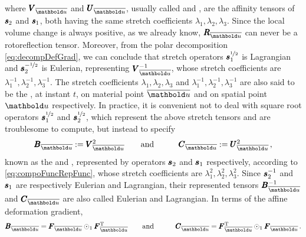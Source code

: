 where $\tnr{V}_{\overline{\vto{u}}}$ and $\tnr{U}_{\overline{\vto{u}}}$, usually called  and , are the affinity tensors of $\pmb{\mathit{s}}_2$ and $\pmb{\mathit{s}}_1$, both having the same stretch coefficients $\lambda_1,\lambda_2,\lambda_3$. Since the local volume change is always positive, as we already know, $\tnr{R}_{\overline{\vto{u}}}$ can never be a rotoreflection tensor. Moreover, from the polar decomposition \eqref{eq:decompDefGrad}, we can conclude that stretch operators $\pmb{s}_1^{\nicefrac{1}{2}}$ is Lagrangian and $\pmb{s}_2^{-\nicefrac{1}{2}}$ is Eulerian, representing $\tnr{V}_{\overline{\vto{u}}}^{-1}$, whose stretch coefficients are $\lambda_1^{-1},\lambda_2^{-1},\lambda_3^{-1}$. The stretch coefficients $\lambda_1,\lambda_2,\lambda_3$ and $\lambda_1^{-1},\lambda_2^{-1},\lambda_3^{-1}$ are also said to be the , at instant $t$, on material point $\overline{\vto{u}}$ and on spatial point $\vto{u}$ respectively. In practice, it is convenient not to deal with square root operators $\pmb{s}_1^{\nicefrac{1}{2}}$ and $\pmb{s}_2^{\nicefrac{1}{2}}$, which represent the above stretch tensors and are troublesome to compute, but instead to specify 
\begin{alignat}{3} 
\tnr{B}_{\overline{\vto{u}}}:=\tnr{V}_{\overline{\vto{u}}}^2&\qquad \text{and}\qquad & \tnr{C}_{\overline{\vto{u}}}:=\tnr{U}_{\overline{\vto{u}}}^2\,,
\end{alignat}
known as the  and , represented by operators $\pmb{s}_2$ and $\pmb{s}_1$ respectively, according to \eqref{eq:compoFuncRepFunc}, whose stretch coefficients are $\lambda_1^2,\lambda_2^2,\lambda_3^2$. Since $\pmb{s}_2^{-1}$ and $\pmb{s}_1$ are respectively Eulerian and Lagrangian, their represented tensors $\tnr{B}_{\overline{\vto{u}}}^{-1}$ and $\tnr{C}_{\overline{\vto{u}}}$ are also called  Eulerian and Lagrangian. In terms of the affine deformation gradient,
\begin{alignat}{3}\label{eq:CauchyGreenGradDef}
\tnr{B}_{\overline{\vto{u}}}=\tnr{F}_{\overline{\vto{u}}}\odot_1\tnr{F}_{\overline{\vto{u}}}^\text{T}&\qquad \text{and}\qquad & \tnr{C}_{\overline{\vto{u}}}=\tnr{F}_{\overline{\vto{u}}}^\text{T}\odot_1\tnr{F}_{\overline{\vto{u}}}\,.
\end{alignat}


